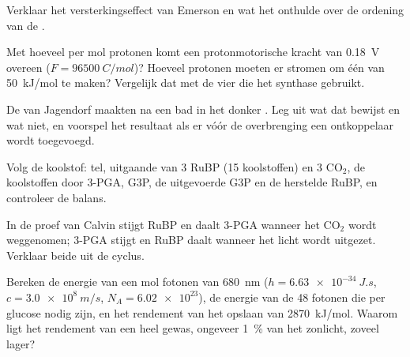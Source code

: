 \begin{exercise}[$\star\star$]\label{exo:b1:photosynthesis:5}
Verklaar het versterkingseffect van Emerson en wat het onthulde over de ordening
van de .
\end{exercise}

\begin{exercise}[$\star\star$]\label{exo:b1:photosynthesis:6}
Met hoeveel  per mol protonen komt een protonmotorische kracht van
\qty{0.18}{V} overeen ($F = \qty{96500}{C/mol}$)? Hoeveel protonen moeten er
stromen om één  van \qty{50}{kJ/mol} te maken? Vergelijk dat met de vier die het
synthase gebruikt.
\end{exercise}

\begin{exercise}[$\star\star$]\label{exo:b1:photosynthesis:7}
De  van Jagendorf maakten na een  bad in het donker . Leg uit wat
dat bewijst en wat niet, en voorspel het resultaat als er vóór de overbrenging een
ontkoppelaar wordt toegevoegd.
\end{exercise}

\begin{exercise}[$\star\star$]\label{exo:b1:photosynthesis:8}
Volg de koolstof: tel, uitgaande van 3 RuBP (15 koolstoffen) en 3
$\mathrm{CO_2}$, de koolstoffen door 3-PGA, G3P, de uitgevoerde G3P en de
herstelde RuBP, en controleer de balans.
\end{exercise}

\begin{exercise}[$\star\star$]\label{exo:b1:photosynthesis:9}
In de proef van Calvin stijgt RuBP en daalt 3-PGA wanneer het $\mathrm{CO_2}$
wordt weggenomen; 3-PGA stijgt en RuBP daalt wanneer het licht wordt uitgezet.
Verklaar beide uit de cyclus.
\end{exercise}

\begin{exercise}[$\star\star\star$]\label{exo:b1:photosynthesis:10}
Bereken de energie van een mol fotonen van \qty{680}{nm} ($h =
\qty{6.63e-34}{J.s}$, $c = \qty{3.0e8}{m/s}$, $N_A = \num{6.02e23}$), de energie
van de 48 fotonen die per glucose nodig zijn, en het rendement van het opslaan van
\qty{2870}{kJ/mol}. Waarom ligt het rendement van een heel gewas, ongeveer
\qty{1}{\%} van het zonlicht, zoveel lager?
\end{exercise}

